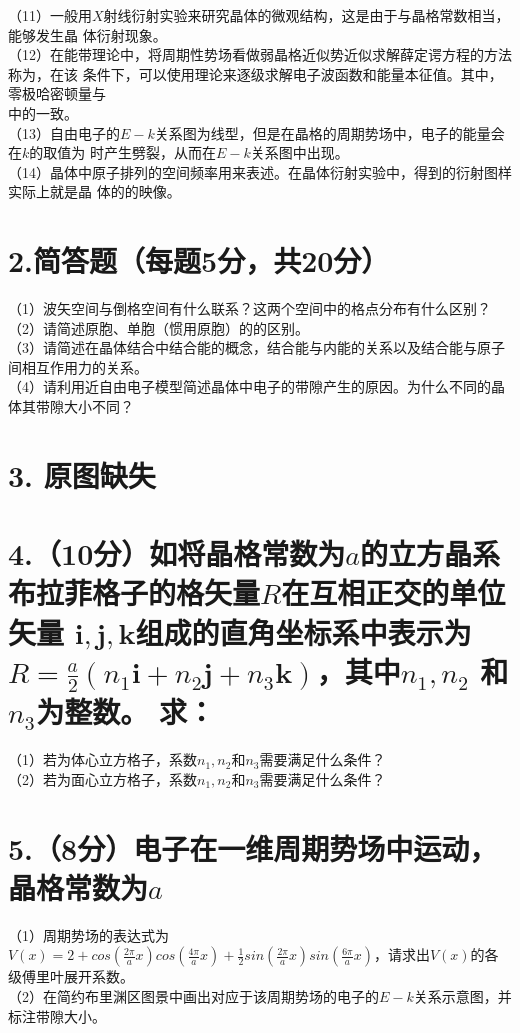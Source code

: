 \documentclass[UTF8]{ctexart}
\begin{document}
（11）一般用$X$射线衍射实验来研究晶体的微观结构，这是由于\uline{\makebox[7em]{}}与晶格常数相当，能够发生晶
体衍射现象。\\
（12）在能带理论中，将周期性势场看做弱晶格近似势近似求解薛定谔方程的方法称为\uline{\makebox[10em]{}}，在该
条件下，可以使用\uline{\makebox[3em]{}}理论来逐级求解电子波函数和能量本征值。其中，零极哈密顿量与\\
\uline{\makebox[12em]{}}中的一致。\\
（13）自由电子的$E-k$关系图为\uline{\makebox[3em]{}}线型，但是在晶格的周期势场中，电子的能量会在$k$的取值为
\uline{\makebox[19em]{}}时产生劈裂，从而在$E-k$关系图中出现\uline{\makebox[3em]{}}。\\
（14）晶体中原子排列的空间频率用\uline{\makebox[4em]{}}来表述。在晶体衍射实验中，得到的衍射图样实际上就是晶
体的\uline{\makebox[4em]{}}的映像。\\
\section*{\bfseries 2.简答题（每题5分，共20分）}
（1）波矢空间与倒格空间有什么联系？这两个空间中的格点分布有什么区别？\\
（2）请简述原胞、单胞（惯用原胞）的的区别。\\
（3）请简述在晶体结合中结合能的概念，结合能与内能的关系以及结合能与原子间相互作用力的关系。\\
（4）请利用近自由电子模型简述晶体中电子的带隙产生的原因。为什么不同的晶体其带隙大小不同？\\
\section*{\bfseries 3. 原图缺失}
\section*{\bfseries 4.（10分）如将晶格常数为$a$的立方晶系布拉菲格子的格矢量$R$在互相正交的单位矢量
$\bm{i},\bm{j},\bm{k}$组成的直角坐标系中表示为$R=\frac{a}{2}(n_1\bm{i}+n_2\bm{j}+n_3\bm{k})$，其中$n_1,n_2$
和$n_3$为整数。 求：}
（1）若为体心立方格子，系数$n_1,n_2$和$n_3$需要满足什么条件？\\
（2）若为面心立方格子，系数$n_1,n_2$和$n_3$需要满足什么条件？\\
\section*{\bfseries 5.（8分）电子在一维周期势场中运动，晶格常数为$a$}
（1）周期势场的表达式为$V(x)=2+cos(\frac{2\pi}{a}x)cos(\frac{4\pi}{a}x)
+\frac{1}{2}sin(\frac{2\pi}{a}x)sin(\frac{6\pi}{a}x)$，请求出$V(x)$的各级傅里叶展开系数。\\
（2）在简约布里渊区图景中画出对应于该周期势场的电子的$E-k$关系示意图，并标注带隙大小。\\
\end{document}
